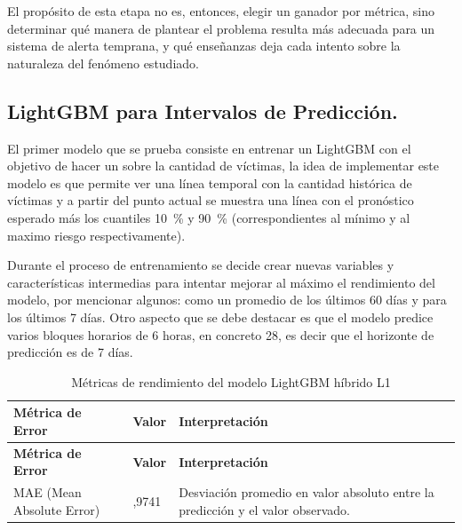 El propósito de esta etapa no es, entonces, elegir un ganador por métrica, sino determinar qué manera de plantear el problema resulta más adecuada para un sistema de alerta temprana, y qué enseñanzas deja cada intento sobre la naturaleza del fenómeno estudiado.

\subsection{LightGBM para Intervalos de Predicción.}\label{lightgbm-para-intervalos-de-predicciuxf3n.}

El primer modelo que se prueba consiste en entrenar un LightGBM con el objetivo de hacer un  sobre la cantidad de víctimas, la idea de implementar este modelo es que permite ver una línea temporal con la cantidad histórica de víctimas y a partir del punto actual se muestra una línea con el pronóstico esperado más los cuantiles \qty{10}{\percent} y \qty{90}{\percent} (correspondientes al mínimo y al maximo riesgo respectivamente).

Durante el proceso de entrenamiento se decide crear nuevas variables y características intermedias para intentar mejorar al máximo el rendimiento del modelo, por mencionar algunos:  como un promedio de los últimos 60 días y  para los últimos 7 días. Otro aspecto que se debe destacar es que el modelo predice varios bloques horarios de 6 horas, en concreto 28, es decir que el horizonte de predicción es de 7 días.

\begin{longtable}[]{@{}
>{\raggedright\arraybackslash}p{}
  >{\centering\arraybackslash}p{}
  >{\raggedright\arraybackslash}p{}@{}}
\caption{Métricas de rendimiento del modelo LightGBM híbrido L1}
\label{tab:metricas-de-rendimiento-del-modelo-final}\\
\toprule\noalign{}
\textbf{Métrica de Error} & \textbf{Valor} & \textbf{Interpretación} \\
\midrule\noalign{}
\endfirsthead
\toprule\noalign{}
\textbf{Métrica de Error} & \textbf{Valor} & \textbf{Interpretación} \\
\midrule\noalign{}
\endhead
\bottomrule\noalign{}
\endlastfoot
MAE (Mean Absolute Error) & 0,9741 & Desviación promedio en valor absoluto entre la predicción y el valor observado. \\
\end{longtable}

